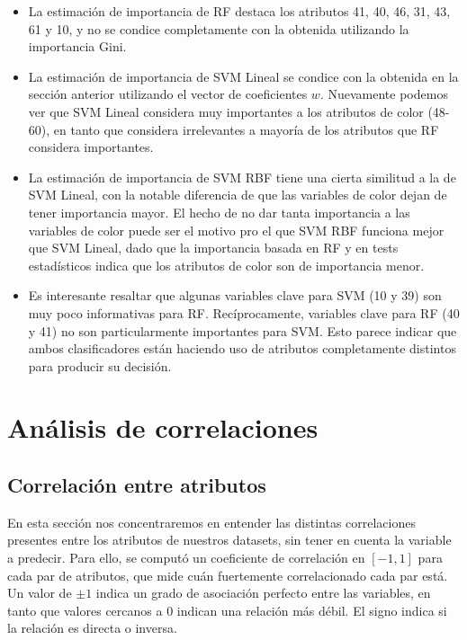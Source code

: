 \begin{itemize}
\item La estimación de importancia de RF destaca los atributos 41, 40, 46, 31, 43, 61 y 10, y no se condice completamente con la obtenida utilizando la importancia Gini.
\item La estimación de importancia de SVM Lineal se condice con la obtenida en la sección anterior utilizando el vector de coeficientes $w$. Nuevamente podemos ver que SVM Lineal considera muy importantes a los atributos de color (48-60), en tanto que considera irrelevantes a mayoría de los atributos que RF considera importantes.
\item La estimación de importancia de SVM RBF tiene una cierta similitud a la de SVM Lineal, con la notable diferencia de que las variables de color dejan de tener importancia mayor. El hecho de no dar tanta importancia a las variables de color puede ser el motivo pro el que SVM RBF funciona mejor que SVM Lineal, dado que la importancia basada en RF y en tests estadísticos indica que los atributos de color son de importancia menor.
\item Es interesante resaltar que algunas variables clave para SVM (10 y 39) son muy poco informativas para RF. Recíprocamente, variables clave para RF (40 y 41) no son particularmente importantes para SVM. Esto parece indicar que ambos clasificadores están haciendo uso de atributos completamente distintos para producir su decisión.
\end{itemize}

\section{ Análisis de correlaciones }

\subsection{ Correlación entre atributos }

En esta sección nos concentraremos en entender las distintas correlaciones presentes entre los atributos de nuestros datasets, sin tener en cuenta la variable a predecir. Para ello, se computó un coeficiente de correlación en $[-1,1]$ para cada par de atributos, que mide cuán fuertemente correlacionado cada par está. Un valor de $\pm 1$ indica un grado de asociación perfecto entre las variables, en tanto que valores cercanos a $0$ indican una relación más débil. El signo indica si la relación es directa o inversa.  \\

